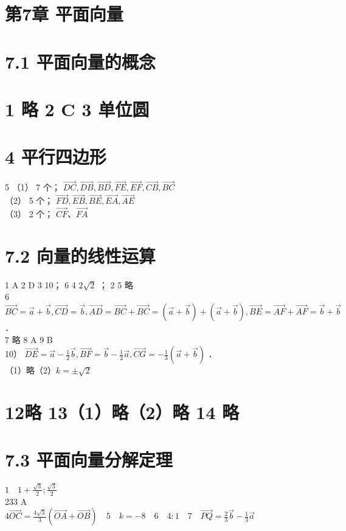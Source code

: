 \documentclass[10pt]{article}
\begin{document}
\section*{第7章 平面向量}
\section*{7.1 平面向量的概念}
\section*{1 略 2 C 3 单位圆}
\section*{4 平行四边形}
5 （1） 7 个； \(\overrightarrow{D C}, \overrightarrow{D B}, \overrightarrow{B D}, \overrightarrow{F E}, \overrightarrow{E F}, \overrightarrow{C B}, \overrightarrow{B C}\)\\
（2） 5 个； \(\overrightarrow{F D}, \overrightarrow{E B}, \overrightarrow{B E}, \overrightarrow{E A}, \overrightarrow{A E}\)\\
（3） 2 个； \(\overrightarrow{C F} 、 \overrightarrow{F A}\)

\section*{7.2 向量的线性运算}
1 A 2 D 3 10； 6 4 \(2 \sqrt{2}\) ； 2 5 略\\
6 \(\overrightarrow{B C}=\vec{a}+\vec{b}, \overrightarrow{C D}=\vec{b}, \overrightarrow{A D}=\overrightarrow{B C}+\overrightarrow{B C}=(\vec{a}+\vec{b})+(\vec{a}+\vec{b}), \overrightarrow{B E}=\overrightarrow{A F}+\overrightarrow{A F}=\vec{b}+\vec{b}\) ．\\
7 略 8 A 9 B\\
10） \(\overrightarrow{D E}=\vec{a}-\frac{1}{2} \vec{b}, \overrightarrow{B F}=\vec{b}-\frac{1}{2} \vec{a}, \overrightarrow{C G}=-\frac{1}{3}(\vec{a}+\vec{b})\) ．\\
（1）略（2）\(k= \pm \sqrt{2}\)

\section*{12略 13（1）略（2）略 14 略}
\section*{7.3 平面向量分解定理}
\(1 \quad 1+\frac{\sqrt{3}}{2} ; \frac{\sqrt{3}}{2}\)\\
233 A\\
\(4 \overrightarrow{O C}=\frac{4 \sqrt{3}}{3}(\overrightarrow{O A}+\overrightarrow{O B}) \quad 5 \quad k=-8 \quad 6 \quad 4: 1 \quad 7 \quad \overrightarrow{P Q}=\frac{2}{3} \vec{b}-\frac{1}{3} \vec{a}\)
\end{document}
